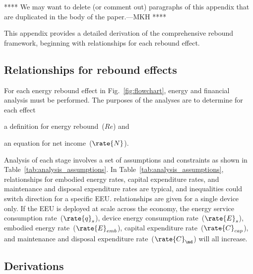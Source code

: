 

**** 
We may want to delete (or comment out)
paragraphs of this appendix that are duplicated
in the body of the paper.---MKH
****

This appendix provides a detailed derivation of the comprehensive rebound framework,
beginning with relationships for each rebound effect.


\subsection{Relationships for rebound effects}
\label{sec:relationships_for_stages}

For each energy rebound effect in Fig.~\ref{fig:flowchart},
energy and financial analysis must be performed.
The purposes of the analyses are to determine for each effect
%
\begin{enumerate*}[label={(\alph*)}]

  \item a definition for energy rebound~($Re$) and

  \item an equation for net income~($\rate{N}$).

\end{enumerate*}

Analysis of each stage involves a set of assumptions and constraints
as shown in Table~\ref{tab:analysis_assumptions}.
In Table~\ref{tab:analysis_assumptions}, 
relationships for \empleffect{} 
embodied energy rates, 
capital expenditure rates, and 
maintenance and disposal expenditure rates
are typical, and
inequalities could switch direction for a specific EEU.
\Prodeffect{} relationships are given for a single device only.
If the EEU is deployed at scale across the economy, 
the energy service consumption rate~($\rate{q}_s$), 
device energy consumption rate~($\rate{E}_s$), 
embodied energy rate~($\rate{E}_{emb}$),
capital expenditure rate~($\rate{C}_{cap}$), and 
maintenance and disposal expenditure rate~($\rate{C}_{\md}$)
will all increase.




\subsection{Derivations}
\label{sec:derivations}


